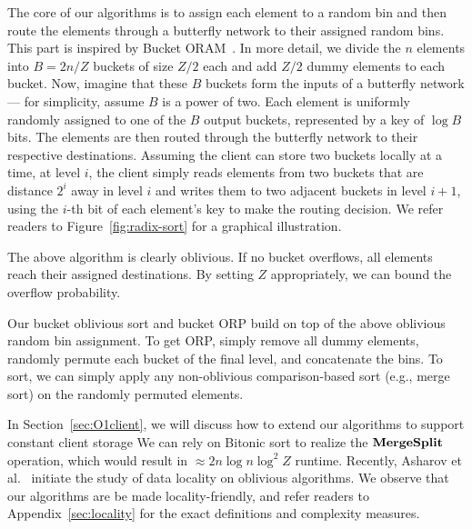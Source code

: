 The core of our algorithms is to assign each element to a random bin and then route the elements through a butterfly network to their assigned random bins. 
This part is inspired by Bucket ORAM~\cite{fletcher2015bucket}. 
In more detail, we divide the $n$ elements into $B=2n/Z$ buckets of size $Z/2$ each and add $Z/2$ dummy elements to each bucket.
Now, imagine that these $B$ buckets form the inputs of a butterfly network --- for simplicity, assume $B$ is a power of two.
Each element is uniformly randomly assigned to one of the $B$ output buckets, represented by a key of $\log B$ bits.
The elements are then routed through the butterfly network to their respective destinations.
Assuming the client can store two buckets locally at a time, at level $i$, the client simply reads elements from two buckets that are distance $2^i$ away in level $i$ and writes them to two adjacent buckets in level $i+1$, using the $i$-th bit of each element's key to make the routing decision. 
We refer readers to Figure~\ref{fig:radix-sort} for a graphical illustration.

The above algorithm is clearly oblivious.
If no bucket overflows, all elements reach their assigned destinations. 
By setting $Z$ appropriately, we can bound the overflow probability.

Our bucket oblivious sort and bucket ORP build on top of the above oblivious random bin assignment. 
To get ORP, simply remove all dummy elements, randomly permute each bucket of the final level, and concatenate the bins.
To sort, we can simply apply any non-oblivious comparison-based sort (e.g., merge sort) on the randomly permuted elements. 

In Section~\ref{sec:O1client}, we will discuss how to extend our algorithms to support constant client storage
We can rely on Bitonic sort to realize the ${\bf MergeSplit}$ operation, which would result in $\approx 2n\log n \log^2 Z$ runtime.
Recently, Asharov et al.~\cite{AsharovCNPRS19} initiate the study of data locality on oblivious algorithms. 
We observe that our algorithms are be made locality-friendly, and refer readers to Appendix~\ref{sec:locality} for the exact definitions and complexity measures.

